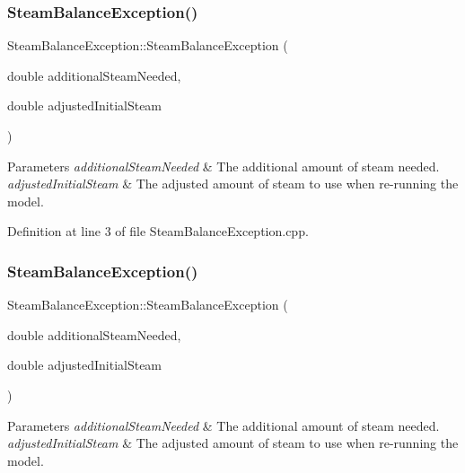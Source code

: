 \subsubsection{\texorpdfstring{Steam\+Balance\+Exception()}{SteamBalanceException()}\hspace{0.1cm}{\footnotesize\ttfamily [1/3]}}
{\footnotesize\ttfamily Steam\+Balance\+Exception\+::\+Steam\+Balance\+Exception (\begin{DoxyParamCaption}\item[{double}]{additional\+Steam\+Needed,  }\item[{double}]{adjusted\+Initial\+Steam }\end{DoxyParamCaption})}


\begin{DoxyParams}{Parameters}
{\em additional\+Steam\+Needed} & The additional amount of steam needed. \\
\hline
{\em adjusted\+Initial\+Steam} & The adjusted amount of steam to use when re-\/running the model. \\
\hline
\end{DoxyParams}


Definition at line 3 of file Steam\+Balance\+Exception.\+cpp.

\mbox{\label{class_steam_balance_exception_ac86eb72f6c1e138ae22f9ab97646e8b3}} 
\subsubsection{\texorpdfstring{Steam\+Balance\+Exception()}{SteamBalanceException()}\hspace{0.1cm}{\footnotesize\ttfamily [2/3]}}
{\footnotesize\ttfamily Steam\+Balance\+Exception\+::\+Steam\+Balance\+Exception (\begin{DoxyParamCaption}\item[{double}]{additional\+Steam\+Needed,  }\item[{double}]{adjusted\+Initial\+Steam }\end{DoxyParamCaption})}


\begin{DoxyParams}{Parameters}
{\em additional\+Steam\+Needed} & The additional amount of steam needed. \\
\hline
{\em adjusted\+Initial\+Steam} & The adjusted amount of steam to use when re-\/running the model. \\
\hline
\end{DoxyParams}
\mbox{\label{class_steam_balance_exception_ac86eb72f6c1e138ae22f9ab97646e8b3}} 
